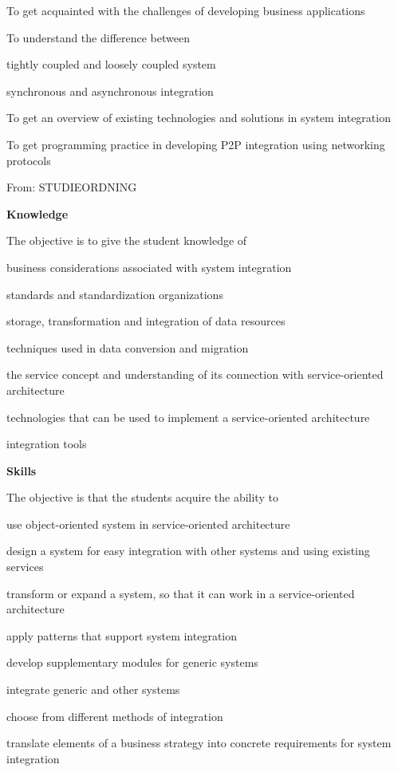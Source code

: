 \documentclass[Screen16to9,17pt]{foils}
\begin{document}

\begin{list1}
\item To get acquainted with the challenges of developing business applications
\item To understand the difference between
\begin{list2}
\item tightly coupled and loosely coupled system
\item synchronous and asynchronous integration
\end{list2}
\item To get an overview of existing technologies and solutions in system integration
\item To get programming practice in developing P2P integration using networking
protocols
\end{list1}


From: STUDIEORDNING

{\bf Knowledge}

The objective is to give the student knowledge of

\begin{list2}
\item business considerations associated with system integration
\item standards and standardization organizations
\item storage, transformation and integration of data resources
\item techniques used in data conversion and migration
\item the service concept and understanding of its connection with service-oriented architecture
\item technologies that can be used to implement a service-oriented architecture
\item integration tools
\end{list2}


{\bf Skills}

The objective is that the students acquire the ability to

\begin{list2}
\item use object-oriented system in service-oriented architecture
\item design a system for easy integration with other systems and using existing services
\item transform or expand a system, so that it can work in a service-oriented architecture
\item apply patterns that support system integration
\item develop supplementary modules for generic systems
\item integrate generic and other systems
\item choose from different methods of integration
\item translate elements of a business strategy into concrete requirements for system integration
\end{list2}
\end{document}
